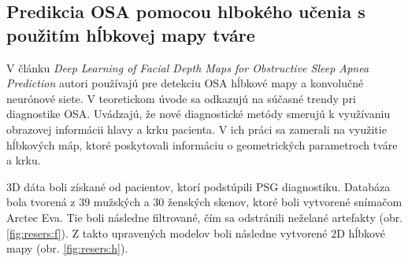 \subsection{Predikcia OSA pomocou hlbokého učenia s použitím hĺbkovej mapy tváre}

V článku \textit{Deep Learning of Facial Depth Maps for Obstructive Sleep Apnea Prediction} autori používajú pre detekciu OSA hĺbkové mapy a konvolučné neurónové siete. V teoretickom úvode sa odkazujú na súčasné trendy pri diagnostike OSA. Uvádzajú, že nové diagnostické metódy smerujú k využívaniu obrazovej informácii hlavy a krku pacienta. V ich práci sa zamerali na využitie hĺbkových máp, ktoré poskytovali informáciu o geometrických parametroch tváre a krku. 

3D dáta boli získané od pacientov, ktorí podstúpili PSG diagnostiku. Databáza bola tvorená z 39 mužských a 30 ženských skenov, ktoré boli vytvorené snímačom Arctec Eva. Tie boli následne filtrované, čím sa odstránili neželané artefakty (obr. \ref{fig:resers:f}). Z takto upravených modelov boli následne vytvorené 2D hĺbkové mapy (obr. \ref{fig:resers:h}).  

